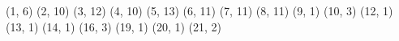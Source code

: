 (1, 6)
(2, 10)
(3, 12)
(4, 10)
(5, 13)
(6, 11)
(7, 11)
(8, 11)
(9, 1)
(10, 3)
(12, 1)
(13, 1)
(14, 1)
(16, 3)
(19, 1)
(20, 1)
(21, 2)